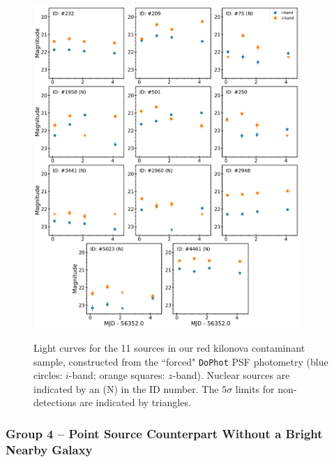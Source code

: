 \begin{figure}[!t]
\begin{center}
\hspace*{-0.1in} 
\scalebox{1.}
{\includegraphics[width=0.9\textwidth]{./figs/chapter3/f4.pdf}}
\caption{Light curves for the 11 sources in our red kilonova contaminant sample, constructed from the ``forced" {\tt DoPhot} PSF photometry (blue circles: $i$-band; orange squares: $z$-band). Nuclear sources are indicated by an (N) in the ID number. The $5\sigma$ limits for non-detections are indicated by triangles.}
\label{fig:final_lc_red}
\end{center}
\vspace{0.5cm}
\end{figure}

\subsubsection{Group 4 -- Point Source Counterpart Without a Bright Nearby Galaxy}
\label{sec:group4}

